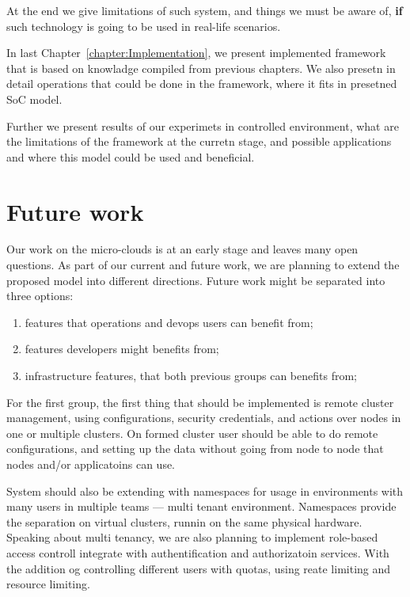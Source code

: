 At the end we give limitations of such system, and things we must be aware of, \textbf{if} such technology is going to be used in real-life scenarios.

In last Chapter~\ref{chapter:Implementation}, we present implemented framework that is based on knowladge compiled from previous chapters. We also presetn in detail operations that could be done in the framework, where it fits in presetned SoC model.

Further we present results of our experimets in controlled environment, what are the limitations of the framework at the curretn stage, and possible applications and where this model could be used and beneficial.
%
%
\section{Future work}\label{sec:future_work}
%
Our work on the micro-clouds is at an early stage and leaves many open questions. As part of our current and future work, we are planning to extend the proposed model into different directions. Future work might be separated into three options:
 
\begin{enumerate}[start=1,label={(\bfseries \arabic*)}]
	\item features that operations and devops users can benefit from;
	\item features developers might benefits from;
	\item infrastructure features, that both previous groups can benefits from;
\end{enumerate}

For the first group, the first thing that should be implemented is remote cluster management, using configurations, security credentials, and actions over nodes in one or multiple clusters. On formed cluster user should be able to do remote configurations, and setting up the data without going from node to node that nodes and/or applicatoins can use.

System should also be extending with namespaces for usage in environments with many users in multiple teams --- multi tenant environment. Namespaces provide the separation on virtual clusters, runnin on the same physical hardware. Speaking about multi tenancy, we are also planning to implement role-based access controll integrate with authentification and authorizatoin services. With the addition og controlling different users with quotas, using reate limiting and resource limiting.

